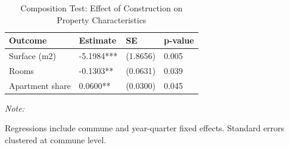 \begin{table}[!h]
\centering
\caption{\label{tab:tab:composition}Composition Test: Effect of Construction on Property Characteristics}
\centering
\begin{threeparttable}
\begin{tabular}[t]{llll}
\toprule
Outcome & Estimate & SE & p-value\\
\midrule
Surface (m2) & -5.1984*** & (1.8656) & 0.005\\
Rooms & -0.1303** & (0.0631) & 0.039\\
Apartment share & 0.0600** & (0.0300) & 0.045\\
\bottomrule
\end{tabular}
\begin{tablenotes}
\item \textit{Note: } 
\item Regressions include commune and year-quarter fixed effects. Standard errors clustered at commune level.
\end{tablenotes}
\end{threeparttable}
\end{table}
